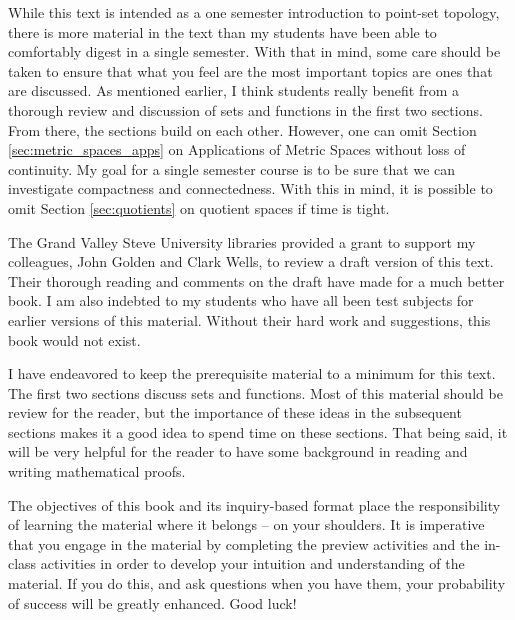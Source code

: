 
While this text is intended as a one semester introduction to point-set topology, there is more material in the text than my students have been able to comfortably digest in a single semester. With that in mind, some care should be taken to ensure that what you feel are the most important topics are ones that are discussed. As mentioned earlier, I think students really benefit from a thorough review and discussion of sets and functions in the first two sections. From there, the sections build on each other. However, one can omit Section \ref{sec:metric_spaces_apps} on Applications of Metric Spaces without loss of continuity. My goal for a single semester course is to be sure that we can investigate compactness and connectedness. With this in mind, it is possible to omit Section \ref{sec:quotients} on quotient spaces if time is tight. 



The Grand Valley Steve University libraries provided a grant to support my colleagues, John Golden and Clark Wells, to review a draft version of this text. Their thorough reading and comments on the draft have made for a much better book. I am also indebted to my students who have all been test subjects for earlier versions of this material. Without their hard work and suggestions, this book would not exist. 


I have endeavored to keep the prerequisite material to a minimum for this text. The first two sections discuss sets and functions. Most of this material should be review for the reader, but the importance of these ideas in the subsequent sections makes it a good idea to spend time on these sections. That being said, it will be very helpful for the reader to have some background in reading and writing mathematical proofs. 

The objectives of this book and its inquiry-based format place the responsibility of learning the material where it belongs -- on your shoulders. It is imperative that you engage in the material by completing the preview activities and the in-class activities in order to develop your intuition and understanding of the material. If you do this, and ask questions when you have them, your probability of success will be greatly enhanced. Good luck!



